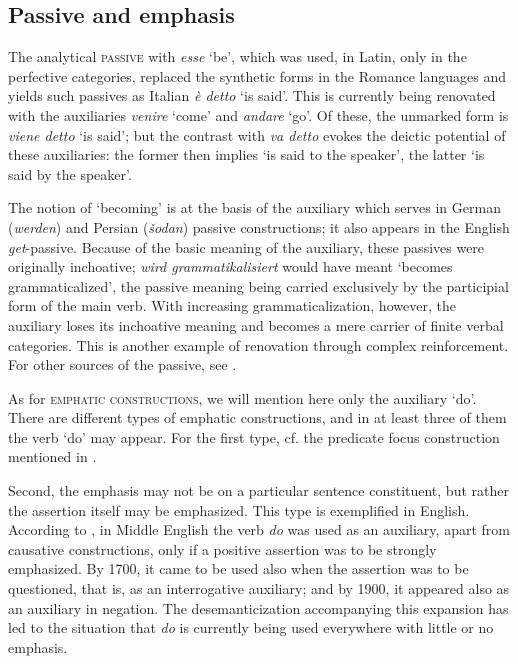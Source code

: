 \subsection{Passive and emphasis}\label{sec:3.1.5}

The analytical \textsc{passive} with \textit{esse} ‘be’, which was used, in Latin, only in the perfective categories, replaced the synthetic forms in the Romance languages and yields such passives as Italian \textit{è detto} ‘is said’. This is currently being renovated with the auxiliaries \textit{venire} ‘come’ and \textit{andare} ‘go’. Of these, the unmarked form is \textit{viene detto} ‘is said’; but the contrast with \textit{va detto} evokes the deictic potential of these auxiliaries: the former then implies ‘is said to the speaker’, the latter ‘is said by the speaker’.

The notion of ‘becoming’ is at the basis of the auxiliary which serves in German (\textit{werden}) and Persian (\textit{šodan}) passive constructions; it also appears in the English \textit{get}{}-passive. Because of the basic meaning of the auxiliary, these passives were originally inchoative; \textit{wird grammatikalisiert} would have meant ‘becomes grammaticalized’, the passive meaning being carried exclusively by the participial form of the main verb. With increasing grammaticalization, however, the auxiliary loses its inchoative meaning and becomes a mere carrier of finite verbal categories. This is another example of renovation through complex reinforcement. For other sources of the passive, see \citet[85f]{Givón1979}.

As for \textsc{emphatic constructions}, we will mention here only the auxiliary ‘do’. There are different types of emphatic constructions, and in at least three of them the verb ‘do’ may appear. For the first type, cf. the predicate focus construction mentioned in .

Second, the emphasis may not be on a particular sentence constituent, but rather the assertion itself may be emphasized. This type is exemplified in English. According to \citet[55]{Traugott1980}, in Middle English the verb \textit{do} was used as an auxiliary, apart from causative constructions, only if a positive assertion was to be strongly emphasized. By 1700, it came to be used also when the assertion was to be questioned, that is, as an interrogative auxiliary; and by 1900, it appeared also as an auxiliary in negation. The desemanticization accompanying this expansion has led to the situation that \textit{do} is currently being used everywhere with little or no emphasis.


